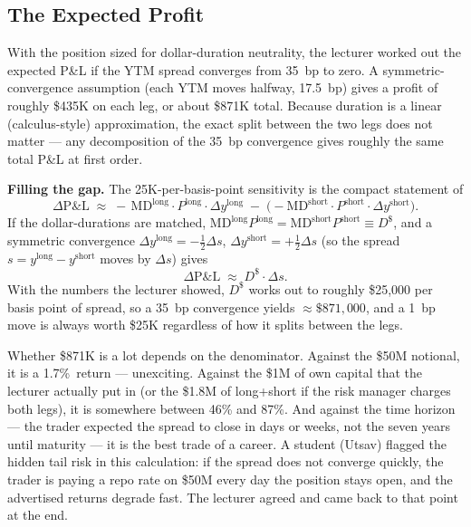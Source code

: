 \subsection{The Expected Profit}\label{L3-sec:case-pnl}

With the position sized for dollar-duration neutrality, the lecturer worked
out the expected P\&L if the YTM spread converges from 35~bp to zero. A
symmetric-convergence assumption (each YTM moves halfway, 17.5~bp) gives a
profit of roughly \$435K on each leg, or about \$871K total. Because
duration is a linear (calculus-style) approximation, the exact split
between the two legs does not matter --- any decomposition of the 35~bp
convergence gives roughly the same total P\&L at first order.

\begin{tipblock}
\textbf{Filling the gap.} The 25K-per-basis-point sensitivity is the
compact statement of
\[
  \Delta \mathrm{P\&L} \;\approx\; -\,\mathrm{MD}^{\text{long}} \cdot P^{\text{long}} \cdot \Delta y^{\text{long}}
  \;-\; \bigl(-\mathrm{MD}^{\text{short}} \cdot P^{\text{short}} \cdot \Delta y^{\text{short}}\bigr).
\]
If the dollar-durations are matched,
$\mathrm{MD}^{\text{long}} P^{\text{long}} = \mathrm{MD}^{\text{short}} P^{\text{short}} \equiv D^\$$, and a symmetric convergence
$\Delta y^{\text{long}} = -\tfrac12 \Delta s$, $\Delta y^{\text{short}} = +\tfrac12 \Delta s$ (so the spread
$s = y^{\text{long}}-y^{\text{short}}$ moves by $\Delta s$) gives
\[
  \Delta \mathrm{P\&L} \;\approx\; D^\$ \cdot \Delta s.
\]
With the numbers the lecturer showed, $D^\$$ works out to roughly
\$25{,}000 per basis point of spread, so a 35~bp convergence yields
$\approx \$871{,}000$, and a 1~bp move is always worth \$25K regardless of
how it splits between the legs.
\end{tipblock}

Whether \$871K is a lot depends on the denominator. Against the \$50M
notional, it is a 1.7\%~return --- unexciting. Against the \$1M of own
capital that the lecturer actually put in (or the \$1.8M of long+short if
the risk manager charges both legs), it is somewhere between
46\% and 87\%. And against the time horizon --- the trader
expected the spread to close in days or weeks, not the seven years until
maturity --- it is the best trade of a career. A student (Utsav) flagged the
hidden tail risk in this calculation: if the spread does not converge
quickly, the trader is paying a repo rate on \$50M every day the position
stays open, and the advertised returns degrade fast. The lecturer agreed
and came back to that point at the end.

